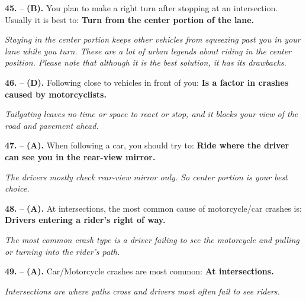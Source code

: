 \begin{minipage}{\linewidth}
\noindent\textbf{45.}  -- \textbf {(B).} You plan to make a right turn after stopping at an intersection. Usually it is best to:  \textbf {Turn from the center portion of the lane.} \par \textit {Staying in the center portion keeps other vehicles from squeezing past you in your lane while you turn. These are a lot of urban legends about riding in the center position. Please note that although it is the best solution, it has its drawbacks.} \\
\end{minipage}

\begin{minipage}{\linewidth}
\noindent\textbf{46.}  -- \textbf {(D).} Following close to vehicles in front of you:  \textbf {Is a factor in crashes caused by motorcyclists.} \par \textit {Tailgating leaves no time or space to react or stop, and it blocks your view of the road and pavement ahead.} \\
\end{minipage}

\begin{minipage}{\linewidth}
\noindent\textbf{47.}  -- \textbf {(A).} When following a car, you should try to:  \textbf {Ride where the driver can see you in the rear-view mirror.} \par \textit {The drivers mostly check rear-view mirror only. So center portion is your best choice.} \\
\end{minipage}

\begin{minipage}{\linewidth}
\noindent\textbf{48.}  -- \textbf {(A).} At intersections, the most common cause of motorcycle/car crashes is:  \textbf {Drivers entering a rider's right of way.} \par \textit {The most common crash type is a driver failing to see the motorcycle and pulling or turning into the rider's path.} \\
\end{minipage}

\begin{minipage}{\linewidth}
\noindent\textbf{49.}  -- \textbf {(A).} Car/Motorcycle crashes are most common:  \textbf {At intersections.} \par \textit {Intersections are where paths cross and drivers most often fail to see riders.} \\
\end{minipage}

